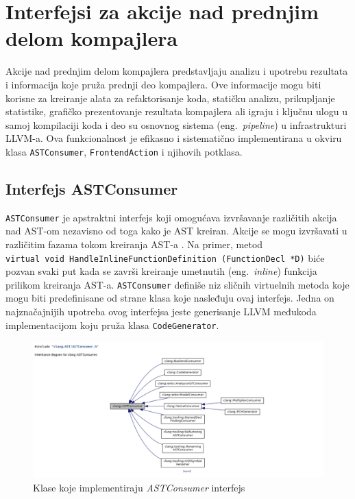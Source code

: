 \documentclass[12pt,oneside]{memoir}
\begin{document}
\section{Interfejsi za akcije nad prednjim delom kompajlera}

Akcije nad prednjim delom kompajlera predstavljaju analizu i upotrebu rezultata i informacija koje pru\v{z}a prednji deo kompajlera. Ove informacije mogu biti korisne za kreiranje alata za refaktorisanje koda, stati\v{c}ku analizu, prikupljanje statistike, grafi\v{c}ko prezentovanje rezultata kompajlera ali igraju i klju\v{c}nu ulogu u samoj kompilaciji koda i deo su osnovnog sistema (eng.~\textit{pipeline}) u infrastrukturi LLVM-a.
Ova funkcionalnost je efikasno i sistemati\v{c}no implementirana u okviru klasa \texttt{ASTConsumer}, \texttt{FrontendAction} i njihovih potklasa.

\subsection{Interfejs ASTConsumer}
\texttt{ASTConsumer} je apstraktni interfejs koji omogu\'{c}ava izvr\v{s}avanje razli\v{c}itih akcija nad AST-om nezavisno od toga kako je AST kreiran.
Akcije se mogu izvr\v{s}avati u razli\v{c}itim fazama tokom kreiranja AST-a \cite{ASTToolTutorial}. Na primer, metod \\ \texttt{virtual void  HandleInlineFunctionDefinition (FunctionDecl *D)} bi\'{c}e pozvan svaki put kada se zavr\v{s}i kreiranje umetnutih (eng.~\textit{inline}) funkcija prilikom kreiranja AST-a. \texttt{ASTConsumer} defini\v{s}e niz sli\v{c}nih virtuelnih metoda koje mogu biti predefinisane od strane klasa koje nasleđuju ovaj interfejs. Jedna on najzna\v{c}ajnijih upotreba ovog interfejsa jeste generisanje LLVM međukoda implementacijom koju pru\v{z}a klasa \texttt{CodeGenerator}. 

\begin{figure}[!h]
\begin{center}
\includegraphics[scale=0.3]{ASTConsumer2.png}
\end{center}
\caption{Klase koje implementiraju \textit{ASTConsumer} interfejs}
\label{fig:exploded}
\end{figure}
\end{document}
